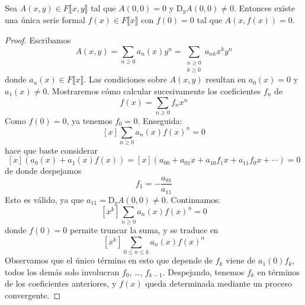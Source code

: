   \begin{theorem}
    \label{theo:series-funciones-implicitas}
    Sea \(A(x, y) \in F \llbracket x, y \rrbracket\)
    tal que \(A(0, 0) = 0\)
    y \(\mathrm{D}_y A(0, 0) \ne 0\).
    Entonces existe
    una única serie formal \(f(x) \in F \llbracket x \rrbracket\)
    con \(f(0) = 0\)
    tal que \(A(x, f(x)) = 0\).
  \end{theorem}
  \begin{proof}
    Escribamos
    \begin{equation*}
      A(x, y)
	= \sum_{n \ge 0} a_n(x) y^n
	= \sum_{\substack{n \ge 0 \\ k \ge 0}} a_{n k} x^k y^n
    \end{equation*}
    donde \(a_n(x) \in F \llbracket x \rrbracket\).
    Las condiciones sobre \(A(x, y)\) resultan en
    \(a_0(x) = 0\) y \(a_1(x) \ne 0\).
    Mostraremos cómo calcular sucesivamente los coeficientes \(f_n\) de
    \begin{equation*}
      f(x)
	= \sum_{n \ge 0} f_n x^n
    \end{equation*}
    Como \(f(0) = 0\),
    ya tenemos \(f_0 = 0\).
    Enseguida:
    \begin{equation*}
      \left[ x \right] \sum_{n \ge 0} a_n(x) f(x)^n
	= 0
    \end{equation*}
    hace que baste considerar
    \begin{equation*}
      \left[ x \right] ( a_0(x) + a_1(x) f(x) )
	= \left[ x \right]
	     (a_{0 0} + a_{0 1} x + a_{1 0} f_1 x + a_{1 1} f_0 x + \dotsb)
	= 0
    \end{equation*}
    de donde despejamos
    \begin{equation*}
      f_1
	= - \frac{a_{0 1}}{a_{1 1}}
    \end{equation*}
    Esto es válido,
    ya que \(a_{1 1} = \mathrm{D}_y A(0, 0) \ne 0\).
    Continuamos:
    \begin{equation*}
      \left[ x^k \right] \sum_{n \ge 0} a_n(x) f(x)^n
	= 0
    \end{equation*}
    donde \(f(0) = 0\) permite truncar la suma,
    y se traduce en
    \begin{equation*}
      \left[ x^k \right]
	\sum_{0 \le n \le k} a_n(x) f(x)^n
    \end{equation*}
    Observamos que el único término en esto que depende de \(f_k\)
    viene de \(a_1(0) f_k\),
    todos los demás solo involucran \(f_0\), \ldots, \(f_{k - 1}\).
    Despejando,
    tenemos \(f_k\) en términos de los coeficientes anteriores,
    y \(f(x)\) queda determinada mediante un proceso convergente.
  \end{proof}

